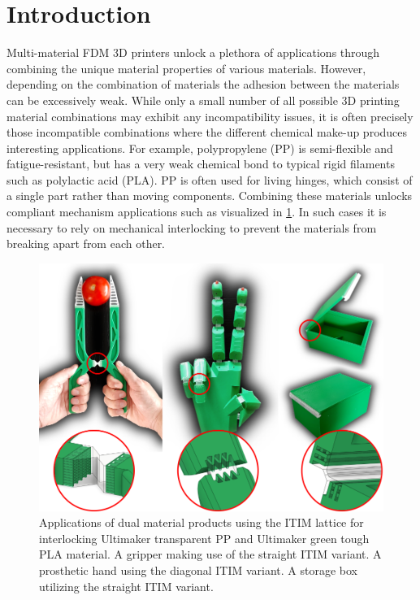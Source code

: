 \section{Introduction}
Multi-material FDM 3D printers unlock a plethora of applications through combining the unique material properties of various materials.
However, depending on the combination of materials the adhesion between the materials can be excessively weak.
While only a small number of all possible 3D printing material combinations may exhibit any incompatibility issues,
it is often precisely those incompatible combinations where the different chemical make-up produces interesting applications.
For example, polypropylene (PP) is semi-flexible and fatigue-resistant, but has a very weak chemical bond to typical rigid filaments such as polylactic acid (PLA).
PP is often used for living hinges, which consist of a single part rather than moving components.
Combining these materials unlocks compliant mechanism applications such as visualized in \cref{fig:applications}.
In such cases it is necessary to rely on mechanical interlocking to prevent the materials from breaking apart from each other.


\begin{figure}
	\centering
	\includegraphics[width=\columnwidth]{sources-applications-applications.png}
	\caption{Applications of dual material products using the ITIM lattice for interlocking Ultimaker transparent PP and Ultimaker green tough PLA material.
	A gripper making use of the straight ITIM variant.
	A prosthetic hand using the diagonal ITIM variant.
	A storage box utilizing the straight ITIM variant.
	}
	\label{fig:applications}
\end{figure}





